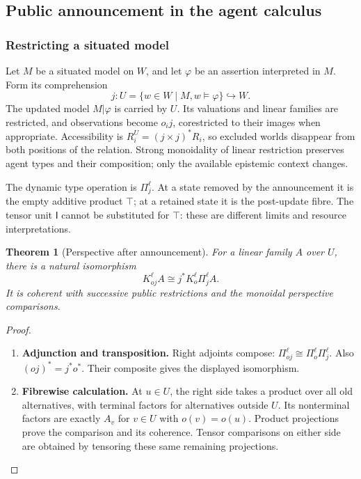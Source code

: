 \documentclass[11pt,a4paper]{article}
\numberwithin{equation}{section}
\newtheorem{theorem}{Theorem}[section]
\theoremstyle{definition}
\theoremstyle{remark}
\theoremstyle{plain}
\providecommand{\I}{\mathsf{I}}
\providecommand{\Top}{\top}
\begin{document}
\subsection{Public announcement in the agent calculus}
\label{agt-sec-public}

\subsubsection{Restricting a situated model}

Let $M$ be a situated model on $W$, and let $\varphi$ be an assertion
interpreted in $M$. Form its comprehension
\[
 j:U=\{w\in W\mid M,w\models\varphi\}\hookrightarrow W.
\]
The updated model $M|\varphi$ is carried by $U$. Its valuations
and linear families are restricted, and observations become $o_i j$,
corestricted to their images when appropriate. Accessibility is
$R_i^U=(j\times j)^*R_i$, so excluded worlds disappear from both
positions of the relation. Strong monoidality of linear restriction
preserves agent types and their composition; only the available
epistemic context changes.

The dynamic type operation is $\Pi_j^\ell$. At a state removed by
the announcement it is the empty additive product $\Top$; at a
retained state it is the post-update fibre. The tensor unit $\I$
cannot be substituted for $\Top$: these are different limits and
resource interpretations.

\begin{theorem}[Perspective after announcement]
\label{agt-thm-announcement-perspective}
For a linear family $A$ over $U$, there is a natural isomorphism
\[
 K_{o j}^\ell A\cong j^*K_o^\ell\Pi_j^\ell A.
\]
It is coherent with successive public restrictions and the monoidal
perspective comparisons.
\end{theorem}
\begin{proof}
\leavevmode
\begin{enumerate}[label=\textup{(\arabic*)},leftmargin=*,itemsep=4pt,topsep=3pt]
  \item \textbf{Adjunction and transposition.} Right adjoints compose: $\Pi_{oj}^\ell\cong\Pi_o^\ell\Pi_j^\ell$. Also $(oj)^*=j^*o^*$. Their composite gives the displayed isomorphism.
  \item \textbf{Fibrewise calculation.} At $u\in U$, the right side takes a product over all old alternatives,
with terminal factors for alternatives outside $U$. Its nonterminal factors
are exactly $A_v$ for $v\in U$ with $o(v)=o(u)$. Product projections prove
the comparison and its coherence. Tensor comparisons on either side are
obtained by tensoring these same remaining projections.
\end{enumerate}
\end{proof}
\end{document}
